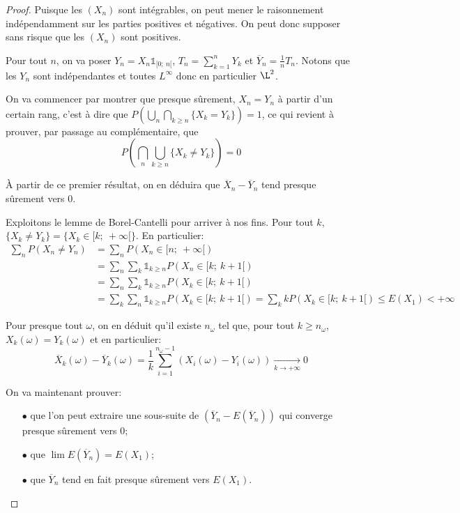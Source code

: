 \begin{proof}
Puisque les $(X_n)$ sont intégrables, on peut mener le raisonnement indépendamment sur les parties positives et négatives. On peut donc supposer sans risque que les $(X_n)$ sont positives. 

\medskip
Pour tout $n$, on va poser $Y_n = X_n \mathbb{1}_{[0;~n[}$, $T_n = \displaystyle{\sum_{k=1}^n} Y_k$ et $\overline{Y}_n = \frac{1}{n} T_n$. Notons que les $Y_n$ sont indépendantes et toutes $L^{\infty}$ donc en particulier $\L^2$.

\medskip
On va commencer par montrer que presque sûrement, $X_n = Y_n$ à partir d'un certain rang, c'est à dire que $P\left ( \bigcup \limits_n \bigcap \limits_{k \geq n} \{ X_k = Y_k \} \right ) = 1$, ce qui revient à prouver, par passage au complémentaire, que 
\[
P \left ( \bigcap \limits_n \bigcup \limits_{k \geq n} \{ X_k \neq Y_k \} \right ) = 0
\]

À partir de ce premier résultat, on en déduira que $\overline{X}_n - \overline{Y}_n$ tend presque sûrement vers $0$.

\medskip
Exploitons le lemme de Borel-Cantelli pour arriver à nos fins. Pour tout $k$, $\{X_k \neq Y_k \} = \{ X_k \in [k;~+\infty[ \}$. En particulier:
\begin{align*}
\displaystyle{\sum \limits_n} P\left ( X_n \neq Y_n \right ) & = \displaystyle{\sum \limits_n} P\left ( X_n \in [n;~+\infty[ \right ) \\
 & = \displaystyle{\sum \limits_n} \displaystyle{\sum \limits_k} \mathbb{1}_{k \geq n} P\left ( X_n \in [k;~k+1[ \right ) \\
 & = \displaystyle{\sum \limits_n} \displaystyle{\sum \limits_k} \mathbb{1}_{k \geq n} P\left ( X_k \in [k;~k+1[ \right ) \\
 & = \displaystyle{\sum \limits_k} \displaystyle{\sum \limits_n}  \mathbb{1}_{k \geq n} P\left ( X_k \in [k;~k+1[ \right ) = \displaystyle{\sum \limits_k} k P\left ( X_k \in [k;~k+1[ \right ) \leq E(X_1) < +\infty
\end{align*}

Pour presque tout $\omega$, on en déduit qu'il existe $n_{\omega}$ tel que, pour tout $k \geq n_{\omega}$, $X_k(\omega) = Y_k(\omega)$ et en particulier:
\[
\overline{X}_k(\omega) - \overline{Y}_k(\omega) = \frac{1}{k} \displaystyle{\sum_{i=1}^{n_\omega-1}} \left ( X_i(\omega) - Y_i(\omega) \right ) \underset{k \to +\infty}{\longrightarrow} 0
\]

On va maintenant prouver:
\begin{itemize}
\item[$\bullet$] 
que l'on peut extraire une sous-suite de $\left ( \overline{Y}_n - E\left ( \overline{Y}_n \right )\right )$ qui converge presque sûrement vers $0$;
\item[$\bullet$] 
que $\lim E \left ( \overline{Y}_n \right ) = E(X_1)$;
\item[$\bullet$] 
que $\overline{Y}_n$ tend en fait presque sûrement vers $E(X_1)$.
\end{itemize}



\end{proof}
